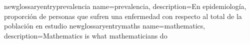 newglossaryentry{prevalencia}{
    name=prevalencia,
    description={En epidemiología, proporción de personas que sufren una enfermedad con respecto al total de la población en estudio}
}
newglossaryentry{maths}{
    name=mathematics,
    description={Mathematics is what mathematicians do}
}
